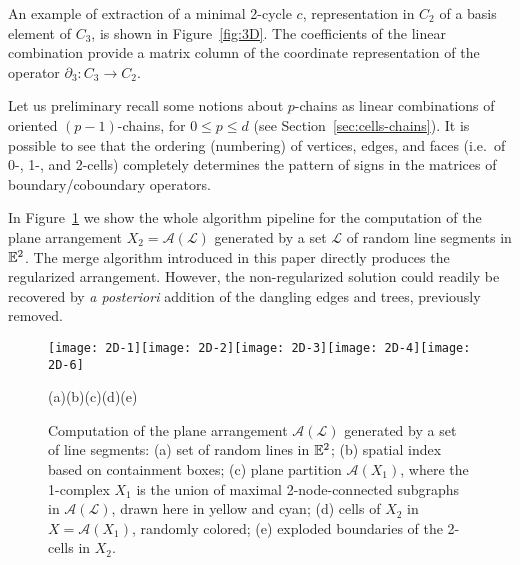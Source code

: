 \begin{example}\label{example2}

An example of extraction of a minimal 2-cycle $c$, representation in $C_2$ of a basis element of $C_3$, is shown in Figure~\ref{fig:3D}. The coefficients of the linear combination provide a matrix column of the coordinate representation of the operator $\partial_3: C_3\to C_2$. 

Let us preliminary recall some notions about $p$-chains as linear combinations of oriented $(p-1)$-chains, for $0\leq p\leq d$ (see Section~\ref{sec:cells-chains}).
It is possible to see that the ordering (numbering) of vertices, edges, and faces (i.e.~of 0-, 1-, and 2-cells) completely determines the pattern of signs in the matrices of boundary/coboundary operators.

\end{example} 


\begin{example}\label{example3}
In Figure~\ref{fig:2D-complex} we show the whole algorithm pipeline for the computation of the plane arrangement $X_2 = \mathcal{A}(\mathcal{L})$ generated by a set $\mathcal{L}$ of random line segments in $\mathbb{E}^2$. {The merge algorithm introduced in this paper directly produces the regularized arrangement. However,  the  non-regularized solution could readily be recovered by  \emph{a posteriori} addition of the dangling edges and trees, previously removed.}
\end{example}

\begin{figure}[htbp] %
   \centering
   \texttt{[image: 2D-1]}\texttt{[image: 2D-2]}\texttt{[image: 2D-3]}\texttt{[image: 2D-4]}\texttt{[image: 2D-6]}
   
{\footnotesize\hspace{.09\textwidth}(a)\hfill(b)\hfill(c)\hfill(d)\hfill(e)\hspace{.09\textwidth}}
   \vspace{-3mm}\caption{Computation of the plane arrangement $\mathcal{A}(\mathcal{L})$ generated by a set of line segments: (a) set of random lines in $\mathbb{E}^2$; (b) spatial index based on containment boxes; (c) plane partition $\mathcal{A}(X_1)$, where the 1-complex $X_1$ is the union of maximal 2-node-connected subgraphs in $\mathcal{A}(\mathcal{L})$, drawn here in yellow and cyan; (d) cells of $X_2$ in $X=\mathcal{A}(X_1)$, randomly colored; (e) exploded boundaries of the 2-cells in $X_2$.}
   \label{fig:2D-complex}
\end{figure}



